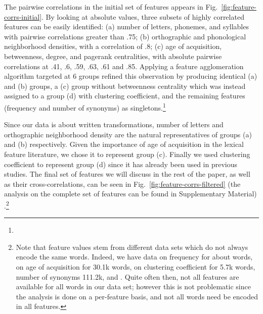 \begin{new}

The pairwise correlations in the initial set of features appears in Fig.~\ref{fig:feature-corrs-initial}.
By looking at absolute values, three subsets of highly correlated features can be easily identified:
(a) number of letters, phonemes, and syllables with pairwise correlations greater than .75;
(b) orthographic and phonological neighborhood densities, with a correlation of .8;
(c) age of acquisition, betweenness, degree, and pagerank centralities, with absolute pairwise correlations at .41, .6, .59, .63, .61 and .85.
Applying a feature agglomeration algorithm targeted at 6 groups refined this observation by producing identical (a) and (b) groups, a (c) group without betweenness centrality which was instead assigned to a group (d) with clustering coefficient, and the remaining features (frequency and number of synonyms) as singletons.\footnote{
}

Since our data is about written transformations, number of letters and orthographic neighborhood density are the natural representatives of groups (a) and (b) respectively.
Given the importance of age of acquisition in the lexical feature literature, we chose it to represent group (c).
Finally we used clustering coefficient to represent group (d) since it has already been used in previous studies.
The final set of features we will discuss in the rest of the paper, as well as their cross-correlations, can be seen in Fig.~\ref{fig:feature-corrs-filtered} (the analysis on the complete set of features can be found in Supplementary Material) .\footnote{
Note that feature values stem from different data sets which do not always encode the same words.
Indeed, we have data on frequency for about  words, on age of acquisition for 30.1k words, on clustering coefficient for 5.7k words, number of synonyms 111.2k, and .
Quite often then, not all features are available for all words in our data set;
however this is not problematic since the analysis is done on a per-feature basis, and not all words need be encoded in all features.}

\end{new}

